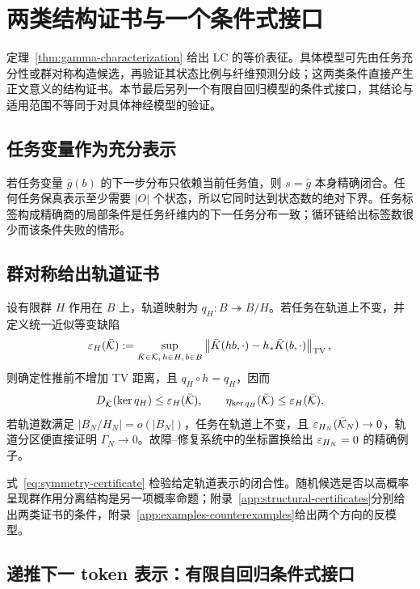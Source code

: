 \section{两类结构证书与一个条件式接口}
\label{sec:construction}

定理~\ref{thm:gamma-characterization} 给出 LC 的等价表征。具体模型可先由任务充分性或群对称构造候选，再验证其状态比例与纤维预测分歧；这两类条件直接产生正文意义的结构证书。本节最后另列一个有限自回归模型的条件式接口，其结论与适用范围不等同于对具体神经模型的验证。

\subsection{任务变量作为充分表示}

若任务变量 $\bar g(b)$ 的下一步分布只依赖当前任务值，则 $s=\bar g$ 本身精确闭合。任何任务保真表示至少需要 $|O|$ 个状态，所以它同时达到状态数的绝对下界。任务标签构成精确商的局部条件是任务纤维内的下一任务分布一致；循环链给出标签数很少而该条件失败的情形。

\subsection{群对称给出轨道证书}

设有限群 $H$ 作用在 $B$ 上，轨道映射为 $q_H:B\twoheadrightarrow B/H$。若任务在轨道上不变，并定义统一近似等变缺陷
\[
\varepsilon_H(\bar{\mathcal K})
:=
\sup_{\bar K\in\bar{\mathcal K},\,h\in H,\,b\in B}
\left\|\bar K(hb,\cdot)-h_*\bar K(b,\cdot)\right\|_{\operatorname{TV}},
\]
则确定性推前不增加 TV 距离，且 $q_H\circ h=q_H$，因而
\begin{equation}
D_{\bar{\mathcal K}}(\ker q_H)\le\varepsilon_H(\bar{\mathcal K}),
\qquad
\eta_{\ker q_H}(\bar{\mathcal K})\le\varepsilon_H(\bar{\mathcal K}).
\label{eq:symmetry-certificate}
\end{equation}
若轨道数满足 $|B_N/H_N|=o(|B_N|)$，任务在轨道上不变，且 $\varepsilon_{H_N}(\bar{\mathcal K}_N)\to0$，轨道分区便直接证明 $\Gamma_N\to0$。故障--修复系统中的坐标置换给出 $\varepsilon_{H_N}=0$ 的精确例子。

式~\eqref{eq:symmetry-certificate} 检验给定轨道表示的闭合性。随机候选是否以高概率呈现群作用分离结构是另一项概率命题；附录~\ref{app:structural-certificates}分别给出两类证书的条件，附录~\ref{app:examples-counterexamples}给出两个方向的反模型。

\subsection{递推下一 token 表示：有限自回归条件式接口}

